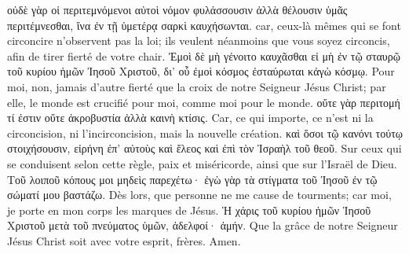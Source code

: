 \documentclass[14pt,a4paper,twoside]{extarticle}
\begin{document}
\begin{paracol}[1]
  \verset
  {οὐδὲ γὰρ οἱ περιτεμνόμενοι αὐτοὶ νόμον φυλάσσουσιν ἀλλὰ θέλουσιν ὑμᾶς περιτέμνεσθαι, ἵνα ἐν τῇ ὑμετέρᾳ σαρκὶ καυχήσωνται.}
  {car, ceux-là mêmes qui se font circoncire n’observent pas la loi; ils veulent néanmoins que vous soyez circoncis, afin de tirer fierté de votre chair.}
  \verset
  {Ἐμοὶ δὲ μὴ γένοιτο καυχᾶσθαι εἰ μὴ ἐν τῷ σταυρῷ τοῦ κυρίου ἡμῶν Ἰησοῦ Χριστοῦ, δι’ οὗ ἐμοὶ κόσμος ἐσταύρωται κἀγὼ κόσμῳ.}
  {Pour moi, non, jamais d’autre fierté que la croix de notre Seigneur Jésus Christ; par elle, le monde est crucifié pour moi, comme moi pour le monde.}
  \verset
  {οὔτε γὰρ περιτομή τί ἐστιν οὔτε ἀκροβυστία ἀλλὰ καινὴ κτίσις.}
  {Car, ce qui importe, ce n’est ni la circoncision, ni l’incirconcision, mais la nouvelle création.}
  \verset
  {καὶ ὅσοι τῷ κανόνι τούτῳ στοιχήσουσιν, εἰρήνη ἐπ’ αὐτοὺς καὶ ἔλεος καὶ ἐπὶ τὸν Ἰσραὴλ τοῦ θεοῦ.}
  {Sur ceux qui se conduisent selon cette règle, paix et miséricorde, ainsi que sur l’Israël de Dieu.}
  \verset
  {Τοῦ λοιποῦ κόπους μοι μηδεὶς παρεχέτω· ἐγὼ γὰρ τὰ στίγματα τοῦ Ἰησοῦ ἐν τῷ σώματί μου βαστάζω.}
  {Dès lors, que personne ne me cause de tourments; car moi, je porte en mon corps les marques de Jésus.}
  \verset
  {Ἡ χάρις τοῦ κυρίου ἡμῶν Ἰησοῦ Χριστοῦ μετὰ τοῦ πνεύματος ὑμῶν, ἀδελφοί· ἀμήν.}
  {Que la grâce de notre Seigneur Jésus Christ soit avec votre esprit, frères. Amen.}

\end{paracol}
\end{document}
